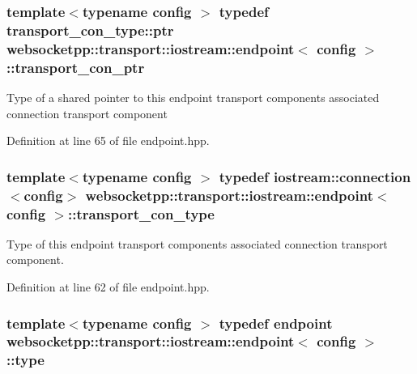 \subsubsection[{transport\+\_\+con\+\_\+ptr}]{\setlength{\rightskip}{0pt plus 5cm}template$<$typename config $>$ typedef {\bf transport\+\_\+con\+\_\+type\+::ptr} {\bf websocketpp\+::transport\+::iostream\+::endpoint}$<$ config $>$\+::{\bf transport\+\_\+con\+\_\+ptr}}\label{classwebsocketpp_1_1transport_1_1iostream_1_1endpoint_a709bba4a4e1e2b7829abe4aa55de8078}
Type of a shared pointer to this endpoint transport component\textquotesingle{}s associated connection transport component 

Definition at line 65 of file endpoint.\+hpp.

\hypertarget{classwebsocketpp_1_1transport_1_1iostream_1_1endpoint_a01827f94c5d01289975146f0438ee79b}{}
\subsubsection[{transport\+\_\+con\+\_\+type}]{\setlength{\rightskip}{0pt plus 5cm}template$<$typename config $>$ typedef {\bf iostream\+::connection}$<$config$>$ {\bf websocketpp\+::transport\+::iostream\+::endpoint}$<$ config $>$\+::{\bf transport\+\_\+con\+\_\+type}}\label{classwebsocketpp_1_1transport_1_1iostream_1_1endpoint_a01827f94c5d01289975146f0438ee79b}
Type of this endpoint transport component\textquotesingle{}s associated connection transport component. 

Definition at line 62 of file endpoint.\+hpp.

\hypertarget{classwebsocketpp_1_1transport_1_1iostream_1_1endpoint_abc21958efa2ee99de526036fb21f5320}{}
\subsubsection[{type}]{\setlength{\rightskip}{0pt plus 5cm}template$<$typename config $>$ typedef {\bf endpoint} {\bf websocketpp\+::transport\+::iostream\+::endpoint}$<$ config $>$\+::{\bf type}}\label{classwebsocketpp_1_1transport_1_1iostream_1_1endpoint_abc21958efa2ee99de526036fb21f5320}



